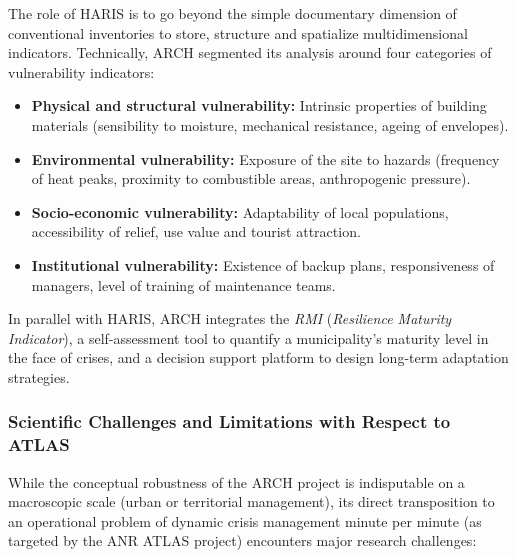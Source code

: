 \documentclass{article}
\begin{document}
The role of HARIS is to go beyond the simple documentary dimension of conventional inventories to store, structure and spatialize multidimensional indicators. Technically, ARCH segmented its analysis around four categories of vulnerability indicators:
\begin{itemize}
\item \textbf {Physical and structural vulnerability:} Intrinsic properties of building materials (sensibility to moisture, mechanical resistance, ageing of envelopes).
\item \textbf {Environmental vulnerability:} Exposure of the site to hazards (frequency of heat peaks, proximity to combustible areas, anthropogenic pressure).
\item \textbf {Socio-economic vulnerability:} Adaptability of local populations, accessibility of relief, use value and tourist attraction.
\item \textbf {Institutional vulnerability:} Existence of backup plans, responsiveness of managers, level of training of maintenance teams.
\end{itemize}

In parallel with HARIS, ARCH integrates the \textit{RMI} (\textit{Resilience Maturity Indicator}), a self-assessment tool to quantify a municipality's maturity level in the face of crises, and a decision support platform to design long-term adaptation strategies.

\subsubsection{Scientific Challenges and Limitations with Respect to ATLAS}

While the conceptual robustness of the ARCH project is indisputable on a macroscopic scale (urban or territorial management), its direct transposition to an operational problem of dynamic crisis management minute per minute (as targeted by the ANR ATLAS project) encounters major research challenges:
\end{document}
